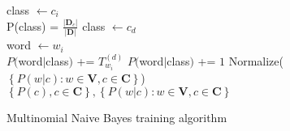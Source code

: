 \begin{algorithm}[h]
\label{algorithm:naive_bayes_training}
 \SetAlgoLined
 
  {
  	class $\leftarrow c_i$\\
  	P(class) = $\frac{\left\vert\mathbf{D}_c\right\vert}{\left\vert\mathbf{D}\right\vert}$
  }
 {
	class $\leftarrow c_d$\\
	{
		word $\leftarrow w_i$ \\
		{
			$P($word$\vert$class$)$ += $T_{w_i}^{(d)}$
		}
		\Else
		{
			$P($word$\vert$class$)$ += $1$
		}
	}
 }
 Normalize($\left\{P(w\vert c) : w \in \mathbf{V}, c \in \mathbf{C}\right\}$)\\
 \Return $\left\{P(c), c \in \mathbf{C}\right\}, \left\{P(w\vert c) : w \in \mathbf{V}, c \in \mathbf{C}\right\}$
 \caption{Multinomial Naive Bayes training algorithm}
\end{algorithm}
